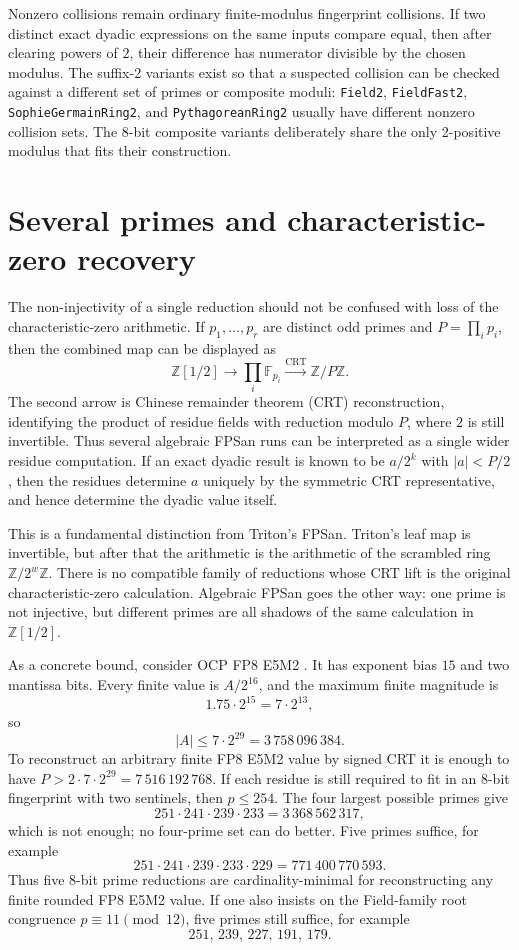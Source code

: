 \documentclass[11pt]{article}
\newcommand{\Z}{\mathbb{Z}}
\newcommand{\F}{\mathbb{F}}
\theoremstyle{plain}
\begin{document}
Nonzero collisions remain ordinary finite-modulus fingerprint collisions.  If
two distinct exact dyadic expressions on the same inputs compare equal, then
after clearing powers of \(2\), their difference has numerator divisible by the
chosen modulus.  The suffix-2 variants exist so that a suspected collision can
be checked against a different set of primes or composite moduli:
\texttt{Field2}, \texttt{FieldFast2}, \texttt{SophieGermainRing2}, and
\texttt{PythagoreanRing2} usually have different nonzero collision sets.  The
8-bit composite variants deliberately share the only 2-positive modulus that
fits their construction.

\section{Several primes and characteristic-zero recovery}

The non-injectivity of a single reduction should not be confused with loss of
the characteristic-zero arithmetic.  If \(p_1,\ldots,p_r\) are distinct odd
primes and \(P=\prod_i p_i\), then the combined map can be displayed as
\[
  \Z[1/2]\longrightarrow \prod_i \F_{p_i}
  \xrightarrow{\mathrm{CRT}} \Z/P\Z.
\]
The second arrow is Chinese remainder theorem (CRT) reconstruction, identifying
the product of residue fields with reduction modulo \(P\), where \(2\) is still
invertible.  Thus several algebraic FPSan runs can be interpreted as a single
wider residue computation.  If an exact dyadic result is known to be \(a/2^k\) with
\(|a|<P/2\), then the residues determine \(a\) uniquely by the symmetric CRT
representative, and hence determine the dyadic value itself.

This is a fundamental distinction from Triton's FPSan.  Triton's leaf map is
invertible, but after that the arithmetic is the arithmetic of the scrambled
ring \(\Z/2^w\Z\).  There is no compatible family of reductions whose CRT lift
is the original characteristic-zero calculation.  Algebraic FPSan goes the other
way: one prime is not injective, but different primes are all shadows of the
same calculation in \(\Z[1/2]\).

As a concrete bound, consider OCP FP8 E5M2 \cite{ocp-ofp8}.
It has exponent bias \(15\) and two mantissa bits.  Every finite value is
\(A/2^{16}\), and the maximum finite magnitude is
\[
  1.75\cdot 2^{15}=7\cdot 2^{13},
\]
so
\[
  |A|\le 7\cdot 2^{29}=3\,758\,096\,384.
\]
To reconstruct an arbitrary finite FP8 E5M2 value by signed CRT it is enough
to have \(P>2\cdot 7\cdot 2^{29}=7\,516\,192\,768\).  If each residue is still
required to fit in an 8-bit fingerprint with two sentinels, then \(p\le 254\).
The four largest possible primes give
\[
  251\cdot 241\cdot 239\cdot 233
  =3\,368\,562\,317,
\]
which is not enough; no four-prime set can do better.  Five primes suffice, for
example
\[
  251\cdot 241\cdot 239\cdot 233\cdot 229
  =771\,400\,770\,593.
\]
Thus five 8-bit prime reductions are cardinality-minimal for reconstructing any
finite rounded FP8 E5M2 value.  If one also insists on the Field-family
root congruence \(p\equiv 11\pmod {12}\), five primes still suffice, for example
\[
  251,\,239,\,227,\,191,\,179.
\]
\end{document}
